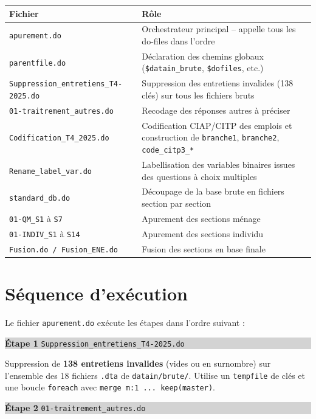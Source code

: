 \documentclass[11pt, a4paper]{article}
\newcommand{\etape}[2]{%
  \noindent\colorbox{lightgray}{\parbox{\dimexpr\linewidth-2\fboxsep}{%
    \textbf{#1} \hfill \texttt{\small #2}%
  }}%
  \vspace{2pt}%
}
\begin{document}
\begin{longtable}{@{}lp{8.5cm}@{}}
\toprule
\textbf{Fichier} & \textbf{Rôle} \\
\midrule
\texttt{apurement.do} & Orchestrateur principal -- appelle tous les do-files
  dans l'ordre \\
\texttt{parentfile.do} & Déclaration des chemins globaux (\texttt{\$datain\_brute},
  \texttt{\$dofiles}, etc.) \\
\texttt{Suppression\_entretiens\_T4-2025.do} & Suppression des entretiens invalides
  (138 clés) sur tous les fichiers bruts \\
\texttt{01-traitrement\_autres.do} & Recodage des réponses \og{}autres à préciser\fg{} \\
\texttt{Codification\_T4\_2025.do} & Codification CIAP/CITP des emplois et
  construction de \texttt{branche1}, \texttt{branche2},
  \texttt{code\_citp3\_*} \\
\texttt{Rename\_label\_var.do} & Labellisation des variables binaires
  issues des questions à choix multiples \\
\texttt{standard\_db.do} & Découpage de la base brute en fichiers
  section par section \\
\texttt{01-QM\_S1} à \texttt{S7} & Apurement des sections ménage \\
\texttt{01-INDIV\_S1} à \texttt{S14} & Apurement des sections individu \\
\texttt{Fusion.do / Fusion\_ENE.do} & Fusion des sections en base finale \\
\bottomrule
\end{longtable}

\section{Séquence d'exécution}

Le fichier \texttt{apurement.do} exécute les étapes dans l'ordre suivant :

\vspace{0.3cm}
\etape{Étape 1}{Suppression\_entretiens\_T4-2025.do}

Suppression de \textbf{138 entretiens invalides} (vides ou en surnombre)
sur l'ensemble des 18 fichiers \texttt{.dta} de \texttt{datain/brute/}.
Utilise un \texttt{tempfile} de clés et une boucle \texttt{foreach}
avec \texttt{merge~m:1~...~keep(master)}.

\vspace{0.2cm}
\etape{Étape 2}{01-traitrement\_autres.do}
\end{document}
